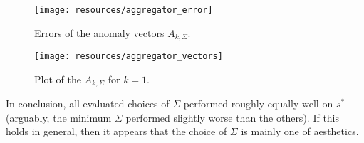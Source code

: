 \begin{figure}[!ht]
    \begin{center}
        \texttt{[image: resources/aggregator\_error]}
    \end{center}
    \caption{\small{Errors of the anomaly vectors $A_{k, \Sigma}$.}}
\label{fig:aggregator_error}
\end{figure}

\begin{wrapfigure}{r}{0.49\textwidth}
\changecaptionwidth
{}
\texttt{[image: resources/aggregator\_vectors]}
\caption{\small{Plot of the $A_{k, \Sigma}$ for $k=1$.}}
\label{fig:aggregator_vectors}
\end{wrapfigure}

In conclusion, all evaluated choices of $\Sigma$ performed roughly equally well on $s^*$ (arguably, the minimum $\Sigma$ performed slightly worse than the others). If this holds in general, then it appears that the choice of $\Sigma$ is mainly one of aesthetics.

